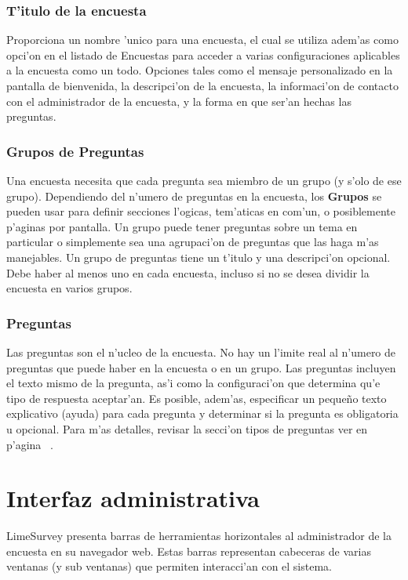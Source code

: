 \documentclass[12pt,spanish]{report}
\begin{document}
\subsection{T'itulo de la encuesta}
\label{'titulo_encuesta'}
Proporciona un nombre 'unico para una encuesta, el cual se utiliza adem'as como opci'on en el listado de Encuestas para acceder a varias configuraciones aplicables a la encuesta como un todo. Opciones tales como el mensaje personalizado en la pantalla de bienvenida, la descripci'on de la encuesta, la informaci'on de contacto con el administrador de la encuesta, y la forma en que ser'an hechas las preguntas.


\subsection{Grupos de Preguntas}
\label{'grupo_preguntas'}
Una encuesta necesita que cada pregunta sea miembro de un grupo (y s'olo de ese grupo). Dependiendo del n'umero de preguntas en la encuesta, los {\bf Grupos} se pueden usar para definir secciones l'ogicas, tem'aticas en com'un, o posiblemente p'aginas por pantalla. Un grupo puede tener preguntas sobre un tema en particular o simplemente sea una agrupaci'on de preguntas que las haga m'as manejables.
Un grupo de preguntas tiene un t'itulo y una descripci'on opcional. Debe haber al menos uno en cada encuesta, incluso si no se desea dividir la encuesta en varios grupos.


\subsection{Preguntas}
\label{'preguntas'}
Las preguntas son el n'ucleo de la encuesta. No hay un l'imite real al n'umero de preguntas que puede haber en la encuesta o en un grupo. Las preguntas incluyen el texto mismo de la pregunta, as'i como la configuraci'on que determina qu'e tipo de respuesta aceptar'an. Es posible, adem'as, especificar un pequeño texto explicativo (ayuda) para cada pregunta y determinar si la pregunta es obligatoria u opcional. Para m'as detalles, revisar la secci'on tipos de preguntas ver en p'agina ~\pageref{'tipos_preguntas'}.

\newpage

\chapter{Interfaz administrativa}
\newpage
LimeSurvey presenta barras de herramientas horizontales al administrador de la encuesta en su navegador web. Estas barras representan cabeceras de varias ventanas (y sub ventanas) que permiten interacci'an con el sistema.
\end{document}
